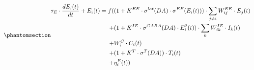\documentclass[
  11pt,
  a4paper,
]{scrbook}
\begin{document}
\begin{equation}\phantomsection\label{eq-jocn:excit}{
\begin{aligned}
    \tau_E \cdot \frac{d E_i (t)}{d t}  + E_i (t) =   f (     & ( 1 + K^{EE} \cdot \sigma^{lat}(DA) \cdot \sigma^{EE} (E_i (t)) ) \cdot \sum_{j \neq i} W^{EE}_{i j} \cdot E_j (t) \\
                                        +    &( 1 + K^{IE} \cdot \sigma^{GABA} (DA) \cdot E_i^2 (t)) \cdot  \sum_k W^{IE}_{i k} \cdot I_k (t) \\
                                        +    & W^{C}_i \cdot C_i (t) \\
                                        +    & (1 + K^{T} \cdot \sigma^{T} (DA) ) \cdot T_i (t)  \\
                                        +    &       \eta^E_i (t) )
\end{aligned}
}\end{equation}
\end{document}
